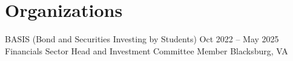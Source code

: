
\section{Organizations}
    \resumeSubHeadingListStart
        \resumeSubheading
        {BASIS (Bond and Securities Investing by Students)}
        {Oct 2022 -- May 2025}
        {Financials Sector Head and Investment Committee Member}
        {Blacksburg, VA}
        \resumeItemListStart
        \resumeItemListEnd
    \resumeSubHeadingListEnd

